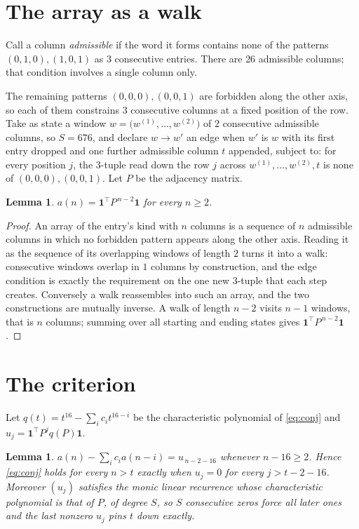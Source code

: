 \documentclass[11pt,a4paper]{article}
\theoremstyle{plain}
\newtheorem{lemma}[theorem]{Lemma}
\theoremstyle{definition}
\begin{document}
\section{The array as a walk}

Call a column \emph{admissible} if the word it forms contains none of the patterns
$(0,1,0), (1,0,1)$ as $3$ consecutive entries. There are $26$ admissible columns; that condition
involves a single column only.

The remaining patterns $(0,0,0), (0,0,1)$ are forbidden along the other axis, so each of them
constrains $3$ consecutive columns at a fixed position of the row. Take as state a
window $w=\bigl(w^{(1)},\dots,w^{(2)}\bigr)$ of $2$ consecutive admissible
columns, so $S=676$, and declare $w\to w'$ an edge when $w'$ is $w$ with its first entry
dropped and one further admissible column $t$ appended, subject to: for every position
$j$, the $3$-tuple read down the row $j$ across $w^{(1)},\dots,w^{(2)},t$
is none of $(0,0,0), (0,0,1)$. Let $P$ be the adjacency matrix.

\begin{lemma}\label{lem:walk}
$a(n)=\mathbf{1}^{\!\top}P^{\,n-2}\mathbf{1}$ for every $n\ge2$.
\end{lemma}

\begin{proof}
An array of the entry's kind with $n$ columns is a sequence of $n$ admissible columns in
which no forbidden pattern appears along the other axis. Reading it as the sequence of its
overlapping windows of length $2$ turns it into a walk: consecutive windows overlap in
$1$ columns by construction, and the edge condition is exactly the requirement on the one
new $3$-tuple that each step creates. Conversely a walk reassembles into such an array,
and the two constructions are mutually inverse. A walk of length $n-2$ visits $n-1$
windows, that is $n$ columns; summing over all starting and ending states gives
$\mathbf{1}^{\!\top}P^{\,n-2}\mathbf{1}$.
\end{proof}

\section{The criterion}

Let $q(t)=t^{16}-\sum_i c_i t^{16-i}$ be the characteristic polynomial of
\eqref{eq:conj} and $u_j=\mathbf{1}^{\!\top}P^{j}q(P)\mathbf{1}$.

\begin{lemma}\label{lem:crit}
$a(n)-\sum_i c_i a(n-i)=u_{\,n-2-16}$ whenever $n-16\ge2$. Hence
\eqref{eq:conj} holds for every $n>t$ exactly when $u_j=0$ for every
$j>t-2-16$. Moreover $(u_j)$ satisfies the monic linear recurrence whose
characteristic polynomial is that of $P$, of degree $S$, so $S$ consecutive zeros force all
later ones and the last nonzero $u_j$ pins $t$ down exactly.
\end{lemma}
\end{document}
